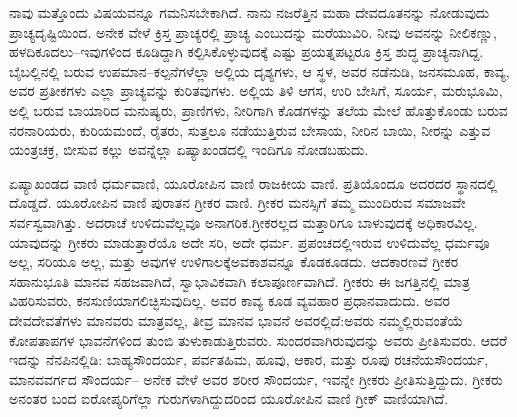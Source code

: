 ನಾವು ಮತ್ತೊಂದು ವಿಷಯವನ್ನೂ ಗಮನಿಸಬೇಕಾಗಿದೆ. ನಾನು ನಜರೆತ್ತಿನ ಮಹಾ ದೇವದೂತನನ್ನು ನೋಡುವುದು ಪ್ರಾಚ್ಯದೃಷ್ಟಿಯಿಂದ. ಅನೇಕ ವೇಳೆ ಕ್ರಿಸ್ತ ಪ್ರಾಚ್ಯರಲ್ಲಿ ಪ್ರಾಚ್ಯ ಎಂಬುದನ್ನು ಮರೆಯುವಿರಿ. ನೀವು ಅವನನ್ನು ನೀಲಿಕಣ್ಣು, ಹಳದಿಕೂದಲು–ಇವು\break ಗಳಿಂದ ಕೂಡಿದ್ದಾಗಿ ಕಲ್ಪಿಸಿಕೊಳ್ಳುವುದಕ್ಕೆ ಎಷ್ಟು ಪ್ರಯತ್ನಪಟ್ಟರೂ ಕ್ರಿಸ್ತ ಶುದ್ಧ ಪ್ರಾಚ್ಯನಾಗಿದ್ದ. ಬೈಬಲ್ಲಿನಲ್ಲಿ ಬರುವ ಉಪಮಾನ–ಕಲ್ಪನೆಗಳೆಲ್ಲಾ ಅಲ್ಲಿಯ ದೃಶ್ಯಗಳು, ಆ ಸ್ಥಳ, ಅವರ ನಡೆನುಡಿ, ಜನಸಮೂಹ, ಕಾವ್ಯ, ಅವರ ಪ್ರತೀಕಗಳು ಎಲ್ಲಾ ಪ್ರಾಚ್ಯವನ್ನು ಕುರಿತವು\-ಗಳು. ಅಲ್ಲಿಯ ತಿಳಿ ಆಗಸ, ಉರಿ ಬೇಸಿಗೆ, ಸೂರ್ಯ, ಮರುಭೂಮಿ, ಅಲ್ಲಿ ಬರುವ ಬಾಯಾರಿದ ಮನುಷ್ಯರು, ಪ್ರಾಣಿಗಳು, ನೀರಿಗಾಗಿ ಕೊಡಗಳನ್ನು ತಲೆಯ ಮೇಲೆ ಹೊತ್ತುಕೊಂಡು ಬರುವ ನರನಾರಿಯರು, ಕುರಿಯಮಂದೆ, ರೈತರು, ಸುತ್ತಲೂ ನಡೆಯುತ್ತಿರುವ ಬೇಸಾಯ, ನೀರಿನ ಬಾಯಿ, ನೀರನ್ನು ಎತ್ತುವ ಯಂತ್ರಚಕ್ರ, ಬೀಸುವ ಕಲ್ಲು ಅವನ್ನೆಲ್ಲಾ ಏಷ್ಯಾಖಂಡದಲ್ಲಿ ಇಂದಿಗೂ ನೋಡಬಹುದು.

ಏಷ್ಯಾಖಂಡದ ವಾಣಿ ಧರ್ಮವಾಣಿ, ಯೂರೋಪಿನ ವಾಣಿ ರಾಜಕೀಯ ವಾಣಿ. ಪ್ರತಿಯೊಂದೂ ಅದರದರ ಸ್ಥಾನದಲ್ಲಿ ದೊಡ್ಡದೆ. ಯೂರೋಪಿನ ವಾಣಿ ಪುರಾತನ ಗ್ರೀಕರ ವಾಣಿ. ಗ್ರೀಕರ ಮನಸ್ಸಿಗೆ ತಮ್ಮ ಮುಂದಿರುವ ಸಮಾಜವೇ ಸರ್ವಸ್ವವಾಗಿತ್ತು. ಅದರಾಚೆ ಉಳಿದುವೆಲ್ಲವೂ ಅನಾಗರಿಕ.ಗ್ರೀಕರಲ್ಲದ ಮತ್ತಾರಿಗೂ ಬಾಳುವುದಕ್ಕೆ ಅಧಿಕಾರವಿಲ್ಲ. ಯಾವುದನ್ನು ಗ್ರೀಕರು ಮಾಡುತ್ತಾರೆಯೊ ಅದೇ ಸರಿ, ಅದೇ ಧರ್ಮ. ಪ್ರಪಂಚದಲ್ಲಿ\break ಇರುವ ಉಳಿದುವೆಲ್ಲ ಧರ್ಮವೂ ಅಲ್ಲ, ಸರಿಯೂ ಅಲ್ಲ, ಮತ್ತು ಅವುಗಳ ಉಳಿಗಾಲಕ್ಕೆ\break ಅವಕಾಶವನ್ನೂ ಕೊಡಕೂಡದು. ಆದಕಾರಣವೆ ಗ್ರೀಕರ ಸಹಾನುಭೂತಿ ಮಾನವ ಸಹಜ\-ವಾಗಿದೆ, ಸ್ವಾಭಾವಿಕವಾಗಿ ಕಲಾಪೂರ್ಣವಾಗಿದೆ. ಗ್ರೀಕರು ಈ ಜಗತ್ತಿನಲ್ಲಿ ಮಾತ್ರ ವಿಹರಿಸುವರು, ಕನಸುಣಿಯಾಗಲಿಚ್ಛಿಸುವುದಿಲ್ಲ. ಅವರ ಕಾವ್ಯ ಕೂಡ ವ್ಯವಹಾರ ಪ್ರಧಾನವಾದುದು. ಅವರ ದೇವದೇವತೆಗಳು ಮಾನವರು ಮಾತ್ರವಲ್ಲ, ತೀವ್ರ ಮಾನವ ಭಾವನೆ ಅವರಲ್ಲಿದೆ:\break ಅವರು ನಮ್ಮಲ್ಲಿರುವಂತೆಯೆ ಕೋಪತಾಪಗಳ ಭಾವನೆಗಳಿಂದ ತುಂಬಿ ತುಳುಕಾಡುತ್ತಿರುವರು. ಸುಂದರವಾಗಿರುವುದನ್ನು ಅವರು ಪ್ರೀತಿಸುವರು. ಆದರೆ ಇದನ್ನು ನೆನಪಿನಲ್ಲಿಡಿ: ಬಾಹ್ಯಸೌಂದರ್ಯ, ಪರ್ವತಹಿಮ, ಹೂವು, ಆಕಾರ, ಮತ್ತು ರೂಪು ರಚನೆಯ\break ಸೌಂದರ್ಯ, ಮಾನವವರ್ಗದ ಸೌಂದರ್ಯ– ಅನೇಕ ವೇಳೆ ಅವರ ಶರೀರ ಸೌಂದರ್ಯ, ಇವನ್ನೇ ಗ್ರೀಕರು ಪ್ರೀತಿಸುತ್ತಿದ್ದುದು. ಗ್ರೀಕರು ಅನಂತರ ಬಂದ ಐರೋಪ್ಯರಿಗೆಲ್ಲಾ ಗುರುಗಳಾಗಿದ್ದುದರಿಂದ ಯೂರೋಪಿನ ವಾಣಿ ಗ್ರೀಕ್​ ವಾಣಿಯಾಗಿದೆ.

